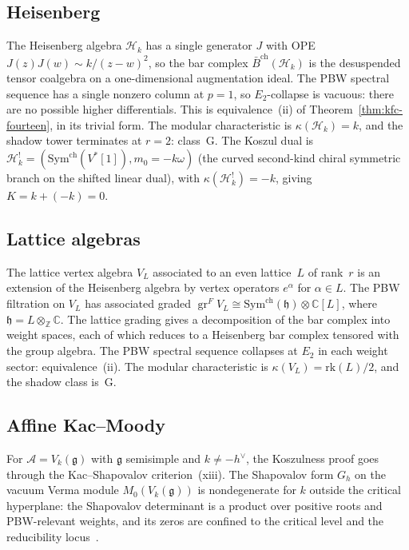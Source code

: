 \documentclass[11pt,reqno]{amsart}
\theoremstyle{definition}
\theoremstyle{remark}
\newcommand{\cA}{\mathcal{A}}
\newcommand{\barBch}{\bar{B}^{\mathrm{ch}}}
\newcommand{\Symch}{\mathrm{Sym}^{\mathrm{ch}}}
\newcommand{\fg}{\mathfrak{g}}
\newcommand{\fh}{\mathfrak{h}}
\newcommand{\bC}{\mathbb{C}}
\newcommand{\bZ}{\mathbb{Z}}
\newcommand{\Etwo}{E_2}
\DeclareMathOperator{\gr}{gr}
\numberwithin{equation}{section}
\begin{document}
\subsection{Heisenberg}

The Heisenberg algebra $\mathcal{H}_k$ has a single generator
$J$ with OPE $J(z) J(w) \sim k/(z-w)^2$, so the bar complex
$\barBch(\mathcal{H}_k)$ is the desuspended tensor coalgebra on
a one-dimensional augmentation ideal. The PBW spectral sequence
has a single nonzero column at $p = 1$, so $\Etwo$-collapse
is vacuous: there are no possible higher differentials. This is
equivalence~(ii) of Theorem~\ref{thm:kfc-fourteen}, in its
trivial form. The modular characteristic is
$\kappa(\mathcal{H}_k) = k$, and the shadow tower terminates
at $r = 2$: class~G. The Koszul dual is
$\mathcal{H}_k^!=(\Symch(V^*[1]),m_0=-k\omega)$
(the curved second-kind chiral symmetric branch on the shifted
linear dual), with
$\kappa(\mathcal{H}_k^!) = -k$, giving
$K = k + (-k) = 0$.

\subsection{Lattice algebras}

The lattice vertex algebra $V_L$ associated to an even
lattice~$L$ of rank~$r$ is an extension of the Heisenberg
algebra by vertex operators $e^\alpha$ for $\alpha \in L$.
The PBW filtration on $V_L$ has associated graded
$\gr^F V_L \cong \Symch(\fh) \otimes \bC[L]$, where
$\fh = L \otimes_\bZ \bC$. The lattice grading gives a
decomposition of the bar complex into weight spaces, each of
which reduces to a Heisenberg bar complex tensored with
the group algebra. The PBW spectral sequence collapses at
$\Etwo$ in each weight sector: equivalence~(ii).
The modular characteristic is
$\kappa(V_L) = \mathrm{rk}(L)/2$, and the shadow class is~G.

\subsection{Affine Kac--Moody}

For $\cA = V_k(\fg)$ with $\fg$ semisimple and $k \neq -h^\vee$,
the Koszulness proof goes through the Kac--Shapovalov
criterion~(xiii). The Shapovalov form $G_h$ on the vacuum Verma
module $M_0(V_k(\fg))$ is nondegenerate for $k$ outside the
critical hyperplane: the Shapovalov determinant is a product
over positive roots and PBW-relevant weights, and its zeros are
confined to the critical level and the reducibility
locus~\cite[Thm.~11.4]{KK79}.
\end{document}
